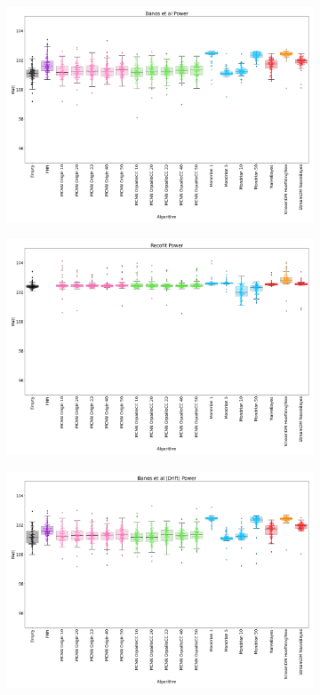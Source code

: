 \begin{figure}
	\begin{subfigure}[t]{.5\linewidth}
		\includegraphics[width=\linewidth]{figures/results/banos_3_watt.png}
		\caption{\banosdataset}
		\label{fig:power-banos}
	\end{subfigure}
	\begin{subfigure}[t]{.5\linewidth}
		\includegraphics[width=\linewidth]{figures/results/recofit_3_watt.png}
		\caption{\recofitdataset}
		\label{fig:power-recofit}
	\end{subfigure}
	\begin{subfigure}[t]{.5\linewidth}
		\includegraphics[width=\linewidth]{figures/results/drift_watt.png}

\end{subfigure}
\end{figure}
